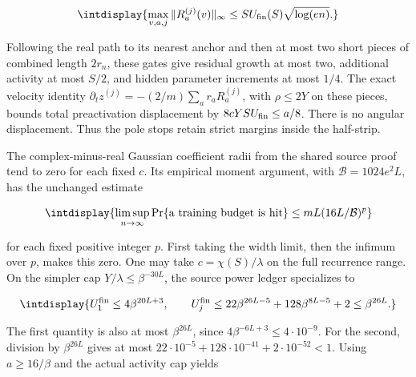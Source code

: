 \begingroup\renewcommand{\theHequation}{intdisplay.496}
\begin{equation*}
\intdisplay{
\max_{v,a,j}\|R_a^{(j)}(v)\|_\infty
\le S U_{\rm fin}(S)\sqrt{\log(en)}.
}
\end{equation*}
\endgroup


Following the real path to its nearest anchor and then at most two short pieces of combined length \(2r_n\), these gates give residual growth at most two, additional activity at most \(S/2\), and hidden parameter increments at most \(1/4\). The exact velocity identity \(\partial_tz^{(j)}=-(2/m)\sum_a r_aR_a^{(j)}\), with \(\rho\le2Y\) on these pieces, bounds total preactivation displacement by \(8cYSU_{\rm fin}\le a/8\). There is no angular displacement. Thus the pole stops retain strict margins inside the half-strip.



The complex-minus-real Gaussian coefficient radii from the shared source proof tend to zero for each fixed \(c\). Its empirical moment argument, with \(\mathcal B=1024e^2L\), has the unchanged estimate


\begingroup\renewcommand{\theHequation}{intdisplay.497}
\begin{equation*}
\intdisplay{
\limsup_{n\to\infty}\Pr\{\text{a training budget is hit}\}
\le mL(16L/\mathcal B)^p
}
\end{equation*}
\endgroup


for each fixed positive integer \(p\). First taking the width limit, then the infimum over \(p\), makes this zero. One may take \(c=\chi(S)/\lambda\) on the full recurrence range. On the simpler cap \(Y/\lambda\le\beta^{-30L}\), the source power ledger specializes to


\begingroup\renewcommand{\theHequation}{intdisplay.498}
\begin{equation*}
\intdisplay{
U_1^{\rm fin}\le4\beta^{20L+3},\qquad
U_j^{\rm fin}\le22\beta^{26L-5}+128\beta^{8L-5}+2
\le\beta^{26L}.
}
\end{equation*}
\endgroup


The first quantity is also at most \(\beta^{26L}\), since \(4\beta^{-6L+3}\le4\cdot10^{-9}\). For the second, division by \(\beta^{26L}\) gives at most \(22\cdot10^{-5}+128\cdot10^{-41}+2\cdot10^{-52}<1\). Using \(a\ge16/\beta\) and the actual activity cap yields


